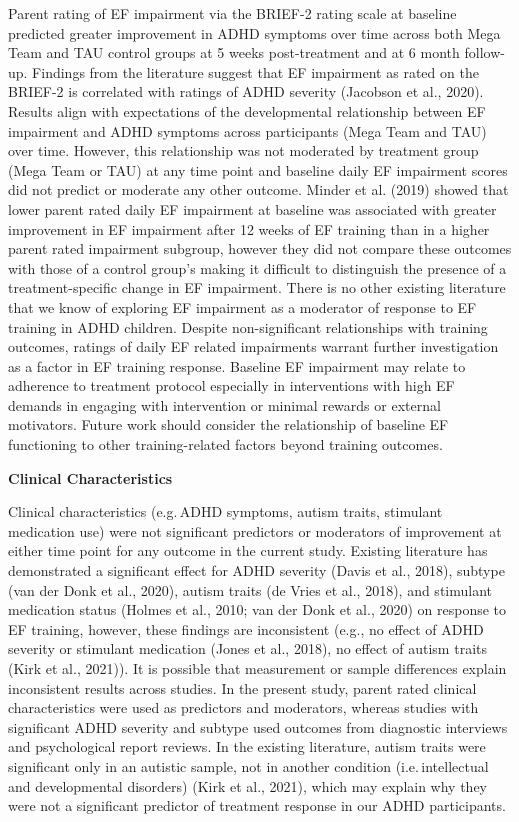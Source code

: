 \documentclass[
  letterpaper,
]{ut-thesis}
\begin{document}
Parent rating of EF impairment via the BRIEF-2 rating scale at baseline
predicted greater improvement in ADHD symptoms over time across both
Mega Team and TAU control groups at 5 weeks post-treatment and at 6
month follow-up. Findings from the literature suggest that EF impairment
as rated on the BRIEF-2 is correlated with ratings of ADHD severity
(Jacobson et al., 2020). Results align with expectations of the
developmental relationship between EF impairment and ADHD symptoms
across participants (Mega Team and TAU) over time. However, this
relationship was not moderated by treatment group (Mega Team or TAU) at
any time point and baseline daily EF impairment scores did not predict
or moderate any other outcome. Minder et al. (2019) showed that lower
parent rated daily EF impairment at baseline was associated with greater
improvement in EF impairment after 12 weeks of EF training than in a
higher parent rated impairment subgroup, however they did not compare
these outcomes with those of a control group's making it difficult to
distinguish the presence of a treatment-specific change in EF
impairment. There is no other existing literature that we know of
exploring EF impairment as a moderator of response to EF training in
ADHD children. Despite non-significant relationships with training
outcomes, ratings of daily EF related impairments warrant further
investigation as a factor in EF training response. Baseline EF
impairment may relate to adherence to treatment protocol especially in
interventions with high EF demands in engaging with intervention or
minimal rewards or external motivators. Future work should consider the
relationship of baseline EF functioning to other training-related
factors beyond training outcomes.

\textbf{Clinical Characteristics}

Clinical characteristics (e.g.\,ADHD symptoms, autism traits, stimulant
medication use) were not significant predictors or moderators of
improvement at either time point for any outcome in the current study.
Existing literature has demonstrated a significant effect for ADHD
severity (Davis et al., 2018), subtype (van der Donk et al., 2020),
autism traits (de Vries et al., 2018), and stimulant medication status
(Holmes et al., 2010; van der Donk et al., 2020) on response to EF
training, however, these findings are inconsistent (e.g., no effect of
ADHD severity or stimulant medication (Jones et al., 2018), no effect of
autism traits (Kirk et al., 2021)). It is possible that measurement or
sample differences explain inconsistent results across studies. In the
present study, parent rated clinical characteristics were used as
predictors and moderators, whereas studies with significant ADHD
severity and subtype used outcomes from diagnostic interviews and
psychological report reviews. In the existing literature, autism traits
were significant only in an autistic sample, not in another condition
(i.e.\,intellectual and developmental disorders) (Kirk et al., 2021),
which may explain why they were not a significant predictor of treatment
response in our ADHD participants.
\end{document}
